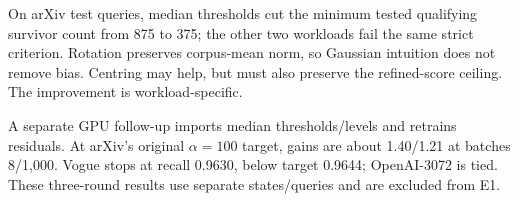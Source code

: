 On arXiv test queries, median thresholds cut the minimum tested qualifying survivor count from 875 to 375; the other two workloads fail the same strict criterion. Rotation preserves corpus-mean norm, so Gaussian intuition does not remove bias. Centring may help, but must also preserve the refined-score ceiling. The improvement is workload-specific.

A separate GPU follow-up imports median thresholds/levels and retrains residuals. At arXiv's original $\alpha=100$ target, gains are about 1.40/1.21 at batches 8/1,000. Vogue stops at recall 0.9630, below target 0.9644; OpenAI-3072 is tied. These three-round results use separate states/queries and are excluded from E1.